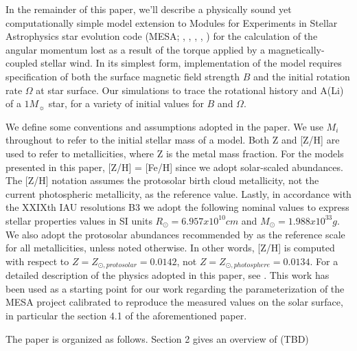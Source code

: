 \documentclass[fleqn,usenatbib]{mnras}
\begin{document}
In the remainder of this paper, we'll describe a physically sound yet computationally simple model extension to Modules for Experiments in Stellar Astrophysics star evolution code (MESA; \citeauthor{Paxton2011} \citeyear{Paxton2011}, \citeyear{Paxton2013}, \citeyear{Paxton2015}, \citeyear{Paxton2018}, \citeyear{Paxton2019}) for the calculation of the angular momentum lost as a result of the torque applied by a magnetically-coupled stellar wind. In its simplest form, implementation of the model requires specification of both the surface magnetic field strength $B$ and the initial  rotation rate $\Omega$ at star surface. Our simulations to trace the rotational history and A(Li) of a $1 M_{\sun}$ star, for a variety of initial values for $B$ and $\Omega$.\par

We define some conventions and assumptions adopted in the paper. We use $M_i$ throughout to refer to the initial stellar mass of a model. Both Z and [Z/H] are used to refer to metallicities, where Z is the metal mass fraction. For the models presented in this paper, [Z/H] = [Fe/H] since we adopt solar-scaled abundances. The [Z/H] notation assumes the \citet{Asplund2009} protosolar birth cloud metallicity, not the current photospheric metallicity, as the reference value. Lastly, in accordance with the XXIXth IAU resolutions B3 \citep{Mamajek2015} we adopt the following nominal values to express stellar properties values in SI units $R_{\odot} = 6.957x10^{10} cm$ and $M_{\odot} = 1.988x10^{33} g$. We also adopt the protosolar abundances recommended by \citet{Asplund2009} as the reference scale for all metallicities, unless noted otherwise. In other words, [Z/H] is computed with respect to $Z = Z_{\odot, protosolar} = 0.0142$, not $Z = Z_{\odot, photosphere} = 0.0134$. For a detailed description of the physics adopted in this paper, see \citet{Choi2016}. This work has been used as a starting point for our work regarding the parameterization of the MESA project calibrated to reproduce the measured values on the solar surface, in particular the section 4.1 of the aforementioned paper.\par
The paper is organized as follows. Section 2 gives an overview of (TBD)
\end{document}

